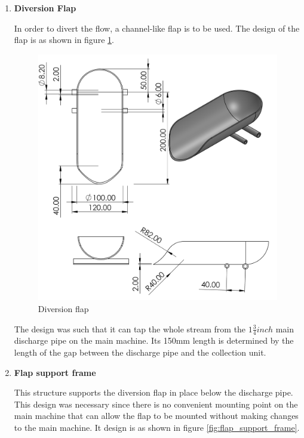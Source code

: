 \begin{enumerate}
    \item \textbf{Diversion Flap}
    \par
    In order to divert the flow, a channel-like flap is to be used. The design of the flap is as shown in figure \ref{fig:diversion_flap}. 
    \begin{figure}[H]
        \centering
        \includegraphics[height=.5\textheight]{Figures/flap2.PNG}
        \caption{Diversion flap}
        \label{fig:diversion_flap}
    \end{figure}
    The design was such that it can tap the whole stream from the $1\frac{3}{4} inch$ main discharge pipe on the main machine. Its 150mm length is determined by the length of the gap between the discharge pipe and the collection unit.
    \item \textbf{Flap support frame}
    \par
    This structure supports the diversion flap in place below the discharge pipe. This design was necessary since there is no convenient mounting point on the main machine that can allow the flap to be mounted without making changes to the main machine. It design is as shown in figure \ref{fig:flap_support_frame}.
    \begin{figure}[H]
        \centering

\end{figure}
\end{enumerate}
